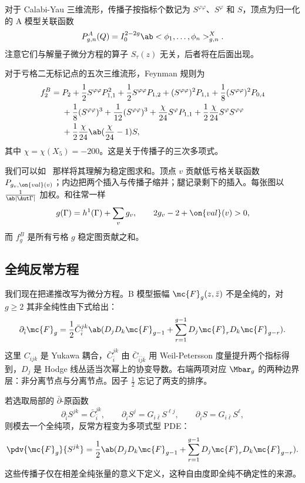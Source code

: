 对于 Calabi-Yau 三维流形，传播子按指标个数记为 \(S^{\varphi\varphi}\)、\(S^{\varphi}\) 和 \(S\)，顶点为归一化的 A 模型关联函数
\[ P^A_{g,n}(Q) = I_0^{2-2g}\ab<\phi_1, \ldots, \phi_n>^X_{g,n}. \]
注意它们与解量子微分方程的算子 \(S_{\tau}(z)\) 无关，后者将在后面出现。

\begin{exm}
    对于亏格二无标记点的五次三维流形，Feynman 规则为
    \begin{align*}
        f_2^B ={}& P_2 + \frac{1}{2}S^{\varphi\varphi}P_{1,1}^2 + \frac{1}{2}S^{\varphi\varphi}P_{1,2} + (S^{\varphi\varphi})^2 P_{1,1} + \frac{1}{8}(S^{\varphi\varphi})^2 P_{0,4} \\
        &+ \frac{1}{8}(S^{\varphi\varphi})^3 + \frac{1}{12}(S^{\varphi\varphi})^3 + \frac{\chi}{24}S^{\varphi}P_{1,1} + \frac{1}{2}\frac{\chi}{24}S^{\varphi}S^{\varphi\varphi} \\
        &+ \frac{1}{2}\frac{\chi}{24}\ab(\frac{\chi}{24}-1)S,
    \end{align*}
    其中 \(\chi = \chi(X_5) = -200\)。这是关于传播子的三次多项式。
\end{exm}

我们可以如~ 那样将其理解为稳定图求和。顶点 \(v\) 贡献低亏格关联函数 \(P_{g_v, \on{val}(v)}\)；内边把两个插入与传播子缩并；腿记录剩下的插入。每张图以 \(\frac{1}{\ab|\Aut \Gamma|}\) 加权。和往常一样
\[ g(\Gamma) = h^1(\Gamma) + \sum_v g_v, \qquad 2g_v - 2 + \on{val}(v) > 0, \]
而 \(f_g^B\) 是所有亏格 \(g\) 稳定图贡献之和。

\subsection{全纯反常方程}%
\label{sub:The holomorphic anomaly equation}

我们现在把递推改写为微分方程。B 模型振幅 \(\mc{F}_g(z,\bar{z})\) 不是全纯的，对 \(g \geq 2\) 其非全纯性由下式给出：
\[ \partial_{\bar{i}} \mc{F}_g = \frac{1}{2}\bar{C}_{\bar{i}}^{jk}\ab( D_j D_k \mc{F}_{g-1} + \sum_{r=1}^{g-1} D_j \mc{F}_r D_k \mc{F}_{g-r} ). \]
这里 \(C_{ijk}\) 是 Yukawa 耦合，\(\bar{C}_{\bar{i}}^{jk}\) 由 \(\bar{C}_{\bar{i}\bar{j}\bar{k}}\) 用 Weil-Petersson 度量提升两个指标得到，\(D_j\) 是 Hodge 线丛适当次幂上的协变导数。右端两项对应 \(\Mbar_g\) 的两种边界层：非分离节点与分离节点。因子 \(\frac{1}{2}\) 忘记了两支的排序。

若选取局部的 \(\bar{\partial}\)-原函数
\[ \partial_{\bar{i}}S^{jk} = \bar{C}_{\bar{i}}^{jk}, \qquad \partial_{\bar{i}}S^j = G_{i\bar{\ell}}S^{\ell j}, \qquad \partial_{\bar{i}}S = G_{i\bar{\ell}}S^{\ell}, \]
则模去一个全纯项，反常方程变为多项式型 PDE：
\[ \pdv{\mc{F}_g}{S^{jk}} = \frac{1}{2}\ab( D_jD_k \mc{F}_{g-1} + \sum_{r=1}^{g-1} D_j \mc{F}_r D_k \mc{F}_{g-r} ). \]
这些传播子仅在相差全纯张量的意义下定义，这种自由度即全纯不确定性的来源。


